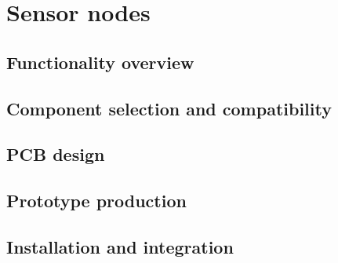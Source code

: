 \chapter{Sensor nodes}

\section{Functionality overview}
\section{Component selection and compatibility}
\section{PCB design}
\section{Prototype production}
\section{Installation and integration}

